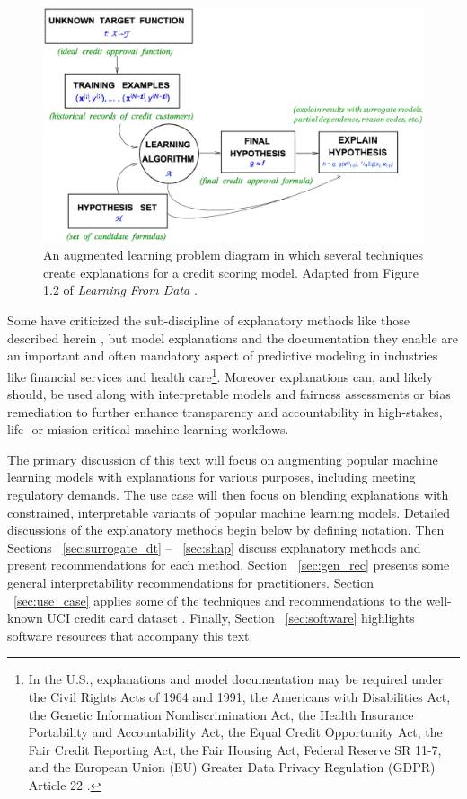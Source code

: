 \documentclass[sigconf, review]{acmart}
\begin{document}
\begin{figure}[htb]

	\begin{center}
		\includegraphics[scale=0.30]{img/figure_1.eps}
		\caption{An augmented learning problem diagram in which several techniques create explanations for a credit scoring model. Adapted from Figure 1.2 of \textit{Learning From Data} \cite{lfd}.}
		\label{fig:learning_problem}
	\end{center}
\end{figure}

Some have criticized the sub-discipline of explanatory methods like those described herein \cite{please_stop}, but model explanations and the documentation they enable are an important and often mandatory aspect of predictive modeling in industries like financial services and health care\footnote{In the U.S., explanations and model documentation may be required under the Civil Rights Acts of 1964 and 1991, the Americans with Disabilities Act, the Genetic Information Nondiscrimination Act, the Health Insurance Portability and Accountability Act, the Equal Credit Opportunity Act, the Fair Credit Reporting Act, the Fair Housing Act, Federal Reserve SR 11-7, and the European Union (EU) Greater Data Privacy Regulation (GDPR) Article 22 \cite{ff_interpretability}.}. Moreover explanations can, and likely should, be used along with interpretable models and fairness assessments or bias remediation to further enhance transparency and accountability in high-stakes, life- or mission-critical machine learning workflows.   

The primary discussion of this text will focus on augmenting popular machine learning models with explanations for various purposes, including meeting regulatory demands. The use case will then focus on blending explanations with constrained, interpretable variants of popular machine learning models. Detailed discussions of the explanatory methods begin below by defining notation. Then Sections ~\ref{sec:surrogate_dt} -- ~\ref{sec:shap} discuss explanatory methods and present recommendations for each method. Section ~\ref{sec:gen_rec} presents some general interpretability recommendations for practitioners. Section ~\ref{sec:use_case} applies some of the techniques and recommendations to the well-known UCI credit card dataset \cite{uci}. Finally, Section ~\ref{sec:software} highlights software resources that accompany this text. 
\end{document}
